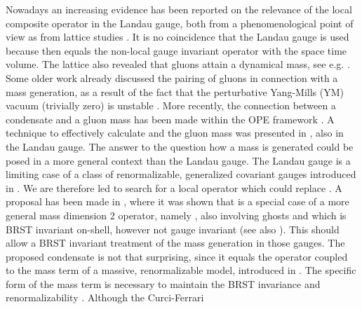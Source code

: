 \documentclass[a4paper,12pt]{article}
\begin{document}
Nowadays an increasing evidence has been reported on the relevance
of the local composite operator \coordHE{} in the Landau gauge, both
from a phenomenological point of view
\cite{Gubarev:2000eu,Gubarev:2000nz} as from lattice studies
\cite{Boucaud:2002nc,Boucaud:2001st,Burgio:1997hc}. It is no
coincidence that the Landau gauge is used because then \coordHE{}
equals the non-local gauge invariant operator
\coordHE{} with \coordHE{}
the space time volume. The lattice also revealed that gluons
attain a dynamical mass, see e.g. \cite
{Langfeld:2001cz,Alexandrou:2001fh}. Some older work already
discussed the pairing of gluons in connection with a mass
generation, as a result of the fact that the perturbative
Yang-Mills (YM) vacuum (trivially zero) is unstable
\cite{Fukuda:1977mz,Fukuda:1977zp,Gusynin:1978tr}. More recently,
the connection between a condensate \coordHE{} and a gluon mass has been made within the OPE
framework \cite{Kondo:2001nq,kmsi}. A technique to effectively
calculate \coordHE{} and the gluon mass was
presented in \cite{v1}, also in the Landau gauge. \newline
\newline
The answer to the question how a mass is generated could be posed in a more
general context than the Landau gauge. The Landau gauge is a limiting case
of a class of renormalizable, generalized covariant gauges introduced in
\cite{Delbourgo:1981cm,Baulieu:sb}. We are therefore led to search for a
local operator which could replace \coordHE{}. A proposal has been made in \cite
{Kondo:2001nq}, where it was shown that \coordHE{} is a special case of a more
general mass dimension 2 operator, namely \coordHE{}, also involving
ghosts and which is BRST invariant on-shell, however not gauge
invariant (see also \cite{Gripaios:2003xq}). This should allow a
BRST invariant treatment of the mass generation in those gauges.
The proposed condensate is not that surprising, since it equals
the operator coupled to the mass term of a massive, renormalizable
\coordHE{} model, introduced in \cite {Curci:bt,Curci:1976ar}. The
specific form of the mass term is necessary to maintain the BRST
invariance and renormalizability \cite
{Curci:bt,Curci:1976ar,deBoer:1995dh}. Although the Curci-Ferrari
\end{document}
